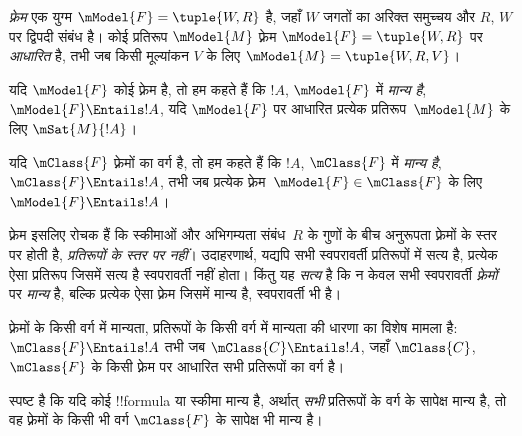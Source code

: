 \documentclass[../../../include/open-logic-section]{subfiles}
\begin{document}


\begin{defn}
  \emph{फ़्रेम} एक युग्म $\mModel{F} = \tuple{W,R}$ है, जहाँ $W$ जगतों का
  अरिक्त समुच्चय और $R$, $W$ पर द्विपदी संबंध है। कोई प्रतिरूप
  $\mModel{M}$ फ़्रेम $\mModel{F} = \tuple{W,R}$ पर \emph{आधारित} है, तभी
  जब किसी मूल्यांकन $V$ के लिए $\mModel{M} = \tuple{W, R, V}$।
\end{defn}

\begin{defn}
  यदि $\mModel{F}$ कोई फ़्रेम है, तो हम कहते हैं कि $!A$, $\mModel{F}$ में
  \emph{मान्य है}, $\mModel{F} \Entails !A$, यदि $\mModel{F}$ पर आधारित
  प्रत्येक प्रतिरूप~$\mModel{M}$ के लिए $\mSat{M}{!A}$।
  
  यदि $\mClass{F}$ फ़्रेमों का वर्ग है, तो हम कहते हैं कि $!A$,
  $\mClass{F}$ में \emph{मान्य है}, $\mClass{F} \Entails !A$, तभी जब
  प्रत्येक फ़्रेम~$\mModel{F} \in \mClass{F}$ के लिए
  $\mModel{F} \Entails !A$।
\end{defn}

फ़्रेम इसलिए रोचक हैं कि स्कीमाओं और अभिगम्यता संबंध~$R$ के गुणों के बीच
अनुरूपता फ़्रेमों के स्तर पर होती है, \emph{प्रतिरूपों के स्तर पर नहीं}।
उदाहरणार्थ, यद्यपि  सभी स्वपरावर्ती प्रतिरूपों में सत्य है, प्रत्येक
ऐसा प्रतिरूप जिसमें  सत्य है स्वपरावर्ती नहीं होता। किंतु यह
\emph{सत्य} है कि न केवल  सभी स्वपरावर्ती \emph{फ़्रेमों} पर
\emph{मान्य} है, बल्कि प्रत्येक ऐसा फ़्रेम जिसमें  मान्य है,
स्वपरावर्ती भी है।

\begin{rem}
फ़्रेमों के किसी वर्ग में मान्यता, प्रतिरूपों के किसी वर्ग में मान्यता की
धारणा का विशेष मामला है: $\mClass{F} \Entails !A$ तभी जब
$\mClass{C} \Entails !A$, जहाँ $\mClass{C}$, $\mClass{F}$ के किसी फ़्रेम
पर आधारित सभी प्रतिरूपों का वर्ग है।

स्पष्ट है कि यदि कोई !!{formula} या स्कीमा मान्य है, अर्थात् \emph{सभी}
प्रतिरूपों के वर्ग के सापेक्ष मान्य है, तो वह फ़्रेमों के किसी भी वर्ग
$\mClass{F}$ के सापेक्ष भी मान्य है।
\end{rem}
\end{document}
